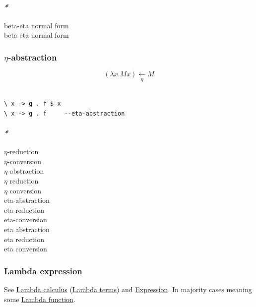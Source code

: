 \documentclass[11pt]{article}
\begin{document}
\paragraph{\emph{*}}
\label{sec:orgc756cb5}

\label{orgce96e21}beta-eta normal form\\
\label{orgc0bddee}beta eta normal form\\

\subsubsection{\label{orgc6f3f7d}\(\eta\)-abstraction}
\label{sec:orgf13e4eb}
$$ (\lambda x.Mx) \xleftarrow[\eta]{} M $$\\

\begin{verbatim}
\ x -> g . f $ x
\ x -> g . f     --eta-abstraction
\end{verbatim}

\paragraph{\emph{*}}
\label{sec:orgb3ade42}

\label{org069b5c7}\(\eta\)-reduction\\
\label{org90845c8}\(\eta\)-conversion\\
\label{orgdac901a}\(\eta\) abstraction\\
\label{orgcf0d9bd}\(\eta\) reduction\\
\label{org6017be9}\(\eta\) conversion\\
\label{orga0d7430}eta-abstraction\\
\label{orge5a2b5c}eta-reduction\\
\label{orgac0638c}eta-conversion\\
\label{orgc7c97f3}eta abstraction\\
\label{org2861f9d}eta reduction\\
\label{org1c698fc}eta conversion\\

\subsubsection{\label{orgb8439cf}Lambda expression}
\label{sec:orged5ca50}
See \hyperref[org37da5f9]{Lambda calculus} (\hyperref[org7b94fd3]{Lambda terms}) and \hyperref[org9021dd7]{Expression}. In majority cases meaning some \hyperref[orgaf59855]{Lambda function}.\\
\end{document}
